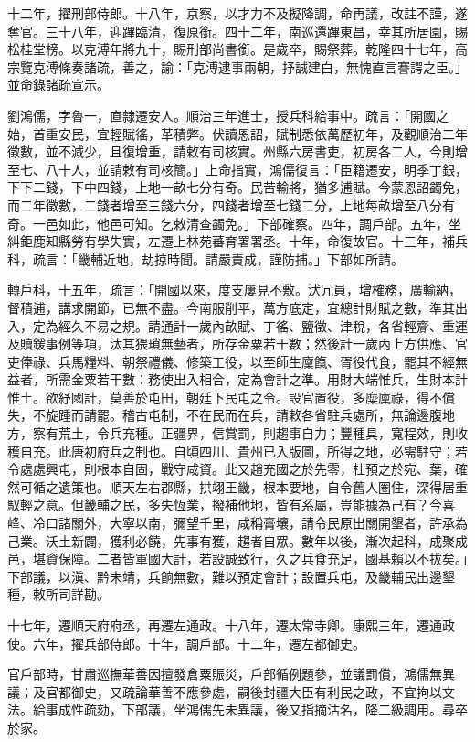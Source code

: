 \begin{pinyinscope}
十二年，擢刑部侍郎。十八年，京察，以才力不及擬降調，命再議，改註不謹，遂奪官。三十八年，迎蹕臨清，復原銜。四十二年，南巡還蹕東昌，幸其所居園，賜松桂堂榜。以克溥年將九十，賜刑部尚書銜。是歲卒，賜祭葬。乾隆四十七年，高宗覽克溥條奏諸疏，善之，諭：「克溥逮事兩朝，抒誠建白，無愧直言謇諤之臣。」並命錄諸疏宣示。

劉鴻儒，字魯一，直隸遷安人。順治三年進士，授兵科給事中。疏言：「開國之始，首重安民，宜輕賦徭，革積弊。伏讀恩詔，賦制悉依萬歷初年，及觀順治二年徵數，並不減少，且復增重，請敕有司核實。州縣六房書吏，初房各二人，今則增至七、八十人，並請敕有司核簡。」上命指實，鴻儒復言：「臣籍遷安，明季丁銀，下下二錢，下中四錢，上地一畝七分有奇。民苦輸將，猶多逋賦。今蒙恩詔蠲免，而二年徵數，二錢者增至三錢六分，四錢者增至七錢二分，上地每畝增至八分有奇。一邑如此，他邑可知。乞敕清查蠲免。」下部確察。四年，調戶部。五年，坐糾鉅鹿知縣勞有學失實，左遷上林苑蕃育署署丞。十年，命復故官。十三年，補兵科，疏言：「畿輔近地，劫掠時聞。請嚴責成，謹防捕。」下部如所請。

轉戶科，十五年，疏言：「開國以來，度支屢見不敷。汱冗員，增榷務，廣輸納，督積逋，講求開節，已無不盡。今南服削平，萬方底定，宜總計財賦之數，準其出入，定為經久不易之規。請通計一歲內畝賦、丁徭、鹽徵、津稅，各省輕齎、重運及贖鍰事例等項，汰其猥瑣無藝者，所存金粟若干數；然後計一歲內上方供應、官吏俸祿、兵馬糧料、朝祭禮儀、修築工役，以至師生廩餼、胥役代食，罷其不經無益者，所需金粟若干數：務使出入相合，定為會計之準。用財大端惟兵，生財本計惟土。欲紓國計，莫善於屯田，朝廷下民屯之令。設官置役，多糜廩祿，得不償失，不旋踵而請罷。稽古屯制，不在民而在兵，請敕各省駐兵處所，無論邊腹地方，察有荒土，令兵充種。正疆界，信賞罰，則趨事自力；豐種具，寬程效，則收穫自充。此唐初府兵之制也。自頃四川、貴州已入版圖，所得之地，必需駐守；若令處處興屯，則根本自固，戰守咸資。此又趙充國之於先零，杜預之於宛、葉，確然可循之遺策也。順天左右郡縣，拱翊王畿，根本要地，自令舊人圈住，深得居重馭輕之意。但畿輔之民，多失恆業，撥補他地，皆有系屬，豈能據為己有？今喜峰、冷口諸關外，大寧以南，彌望千里，咸稱膏壤，請令民原出關開墾者，許承為己業。沃土新闢，獲利必饒，先事有獲，趨者自眾。數年以後，漸次起科，成聚成邑，堪資保障。二者皆軍國大計，若設誠致行，久之兵食充足，國基賴以不拔矣。」下部議，以滇、黔未靖，兵餉無數，難以預定會計；設置兵屯，及畿輔民出邊墾種，敕所司詳勘。

十七年，遷順天府府丞，再遷左通政。十八年，遷太常寺卿。康熙三年，遷通政使。六年，擢兵部侍郎。十年，調戶部。十二年，遷左都御史。

官戶部時，甘肅巡撫華善因擅發倉粟賑災，戶部循例題參，並議罰償，鴻儒無異議；及官都御史，又疏論華善不應參處，嗣後封疆大臣有利民之政，不宜拘以文法。給事成性疏劾，下部議，坐鴻儒先未異議，後又指摘沽名，降二級調用。尋卒於家。


\end{pinyinscope}
